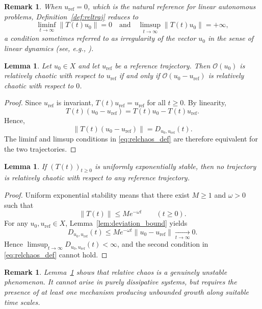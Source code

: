 \documentclass[12pt]{article}
\newtheorem{lemma}[theorem]{Lemma}
\newtheorem{remark}[theorem]{Remark}
\begin{document}
\begin{remark}\label{rem:zero_reference}
When $u_{\mathrm{ref}}=0$, which is the natural reference for linear autonomous problems, Definition~\ref{def:reltraj} reduces to
\[
\liminf_{t\to\infty}\|T(t)u_0\|=0
\quad\text{and}\quad
\limsup_{t\to\infty}\|T(t)u_0\|=+\infty,
\]
a condition sometimes referred to as \emph{irregularity} of the vector $u_0$ in the sense of linear dynamics (see, e.g.,
\cite{Rolewicz1969,BayartMatheron2009}).
\end{remark}


\begin{lemma}\label{lem:translation}
Let $u_0\in X$ and let $u_{\mathrm{ref}}$ be a reference trajectory.
Then $\mathcal{O}(u_0)$ is relatively chaotic with respect to $u_{\mathrm{ref}}$ if and only if $\mathcal{O}(u_0-u_{\mathrm{ref}})$ is relatively chaotic with
respect to $0$.
\end{lemma}

\begin{proof}
Since $u_{\mathrm{ref}}$ is invariant, $T(t)u_{\mathrm{ref}}=u_{\mathrm{ref}}$ for all $t\ge 0$. By linearity,
\[
T(t)(u_0-u_{\mathrm{ref}})
= T(t)u_0-T(t)u_{\mathrm{ref}}.
\]
Hence,
\[
\|T(t)(u_0-u_{\mathrm{ref}})\|
= D_{u_0,u_{\mathrm{ref}}}(t).
\]
The liminf and limsup conditions in \eqref{eq:relchaos_def} are therefore equivalent for the two trajectories.
\end{proof}

\begin{lemma}\label{lem:noexpstable}
If $(T(t))_{t\ge 0}$ is uniformly exponentially stable, then no trajectory is relatively chaotic with respect to any reference trajectory.
\end{lemma}

\begin{proof}
Uniform exponential stability means that there exist $M\ge 1$ and $\omega>0$ such that
\[
\|T(t)\|\le M e^{-\omega t}\qquad (t\ge 0).
\]
For any $u_0,u_{\mathrm{ref}}\in X$, Lemma~\ref{lem:deviation_bound} yields
\[
D_{u_0,u_{\mathrm{ref}}}(t)
\le M e^{-\omega t}\|u_0-u_{\mathrm{ref}}\|\xrightarrow[t\to\infty]{}0.
\]
Hence $\limsup_{t\to\infty}D_{u_0,u_{\mathrm{ref}}}(t)<\infty$, and the second condition in \eqref{eq:relchaos_def} cannot hold.
\end{proof}

\begin{remark}
Lemma~\ref{lem:noexpstable} shows that relative chaos is a genuinely unstable
phenomenon. It cannot arise in purely dissipative systems, but requires the presence of at least one mechanism producing unbounded growth along suitable time scales.
\end{remark}
\end{document}
